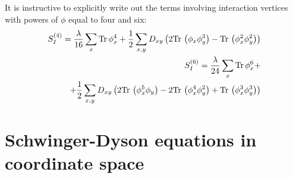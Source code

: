 \documentclass[12pt]{article}
\newcommand{\lr}[1]{ \left( #1 \right) }
\newcommand{\tr}{ {\rm Tr} \, }
\begin{document}
It is instructive to explicitly write out the terms involving interaction vertices with powers of $\phi$ equal to four and six:
\begin{eqnarray}
\label{interaction_action_phi4}
 S_I^{\lr{4}} = \frac{\lambda}{16} \sum\limits_x \tr \phi_x^4
 +
 \frac{1}{2} \sum\limits_{x, y} D_{x y} \lr{
  2 \tr\lr{\phi_x \phi_y^3}
  -
  \tr\lr{\phi_x^2 \phi_y^2} } \\
\label{interaction_action_phi6}
 S_I^{\lr{6}} = \frac{\lambda}{24} \sum\limits_x \tr \phi_x^6
 + \nonumber \\ +
 \frac{1}{2} \sum\limits_{x, y} D_{x y} \lr{
  2 \tr\lr{\phi_x^5 \phi_y}
  -
  2 \tr\lr{\phi_x^4 \phi_y^2}
  +
  \tr\lr{\phi_x^3 \phi_y^3}
 }
\end{eqnarray}

\section{Schwinger-Dyson equations in coordinate space}
\label{sec:sd_coordinate}
\end{document}
